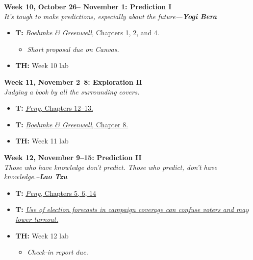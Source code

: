\documentclass[11pt]{article}
\begin{document}
\textbf{Week 10, October 26-- November 1: Prediction I}
\\
\textit{It's tough to make predictions, especially about the future---\textbf{Yogi Bera}}
\begin{itemize}

\item \textbf{T:} \href{https://bradleyboehmke.github.io/HOML/intro.html}{\textit{Boehmke \& Greenwell}, Chapters 1, 2, and 4.} 
\begin{itemize}
\item \textit{Short proposal due on Canvas.}
\end{itemize}
\item \textbf{TH:} Week 10 lab
\end{itemize}
\vspace{1em}

\textbf{Week 11, November 2--8: Exploration II}
\\
\textit{Judging a book by all the surrounding covers.}
\begin{itemize}
\item \textbf{T:} \href{https://bookdown.org/rdpeng/exdata/}{\textit{Peng}, Chapters 12--13.} 
\item \textbf{T:} \href{https://bookdown.org/rdpeng/exdata/}{\textit{Boehmke \& Greenwell}, Chapter 8.} 
\item \textbf{TH:} Week 11 lab
\end{itemize}
\vspace{1em}

\textbf{Week 12, November 9--15: Prediction II}
\\
\textit{Those who have knowledge don't predict. Those who predict, don't have knowledge.--\textbf{Lao Tzu}}
\begin{itemize}
\item \textbf{T:} \href{https://bookdown.org/rdpeng/exdata/}{\textit{Peng}, Chapters 5, 6, 14} 
\item \textbf{T:} \href{https://www.pewresearch.org/fact-tank/2018/02/06/use-of-election-forecasts-in-campaign-coverage-can-confuse-voters-and-may-lower-turnout/}{\textit{Use of election forecasts in campaign coverage can confuse voters and may lower turnout.}} 
\item \textbf{TH:} Week 12 lab
\begin{itemize}
\item \textit{Check-in report due.}
\end{itemize}
\end{itemize}
\vspace{1em}
\end{document}

